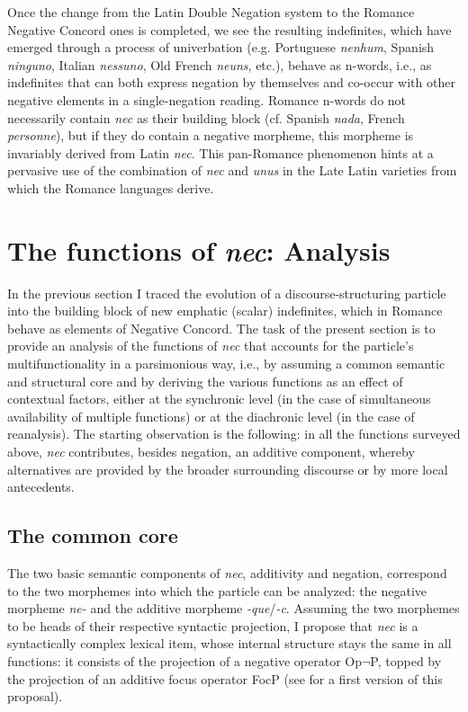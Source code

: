 \documentclass[output=paper]{langsci/langscibook}
\begin{document}
\noindent Once the change from the Latin Double Negation system to the Romance Negative Concord ones is completed, we see the resulting indefinites, which have emerged through a process of univerbation (e.g. Portuguese {\emph{nenhum}}, Spanish {\emph{ninguno}}, Italian {\emph{nessuno}}, Old French {\emph{neuns}}, etc.), behave as n-words, i.e., as indefinites that can both express negation by themselves and co-occur with other negative elements in a single-negation reading. Romance n-words do not necessarily contain {\emph{nec}} as their building block (cf. Spanish {\emph{nada}}, French {\emph{personne}}), but if they do contain a negative morpheme, this morpheme is invariably derived from Latin {\emph{nec}}. This pan-Romance phenomenon hints at a pervasive use of the combination of {\emph{nec}} and {\emph{unus}} in the Late Latin varieties from which the Romance languages derive.

\section{The functions of {\emph{nec}}: Analysis} \label{sectionanalysis}

In the previous section I traced the evolution of a discourse-structuring particle into the building block of new emphatic (scalar) indefinites, which in Romance behave as elements of Negative Concord. The task of the present section is to provide an analysis of the functions of {\emph{nec}} that accounts for the particle's multifunctionality in a parsimonious way, i.e., by assuming a common semantic and structural core and by deriving the various functions as an effect of contextual factors, either at the synchronic level (in the case of simultaneous availability of multiple functions) or at the diachronic level (in the case of reanalysis). The starting observation is the following: in all the functions surveyed above, {\emph{nec}} contributes, besides negation, an additive component, whereby alternatives are provided by the broader surrounding discourse or by more local antecedents.

\subsection{The common core}

The two basic semantic components of {\emph{nec}}, additivity and negation, correspond to the two morphemes into which the particle can be analyzed: the negative morpheme {\emph{ne-}} and the additive morpheme {\emph{-que}}/{\emph{-c}}. Assuming the two morphemes to be heads of their respective syntactic projection, I propose that {\emph{nec}} is a syntactically complex lexical item, whose internal structure stays the same in all functions: it consists of the projection of a negative operator Op$\lnot$P, topped by the projection of an additive focus operator FocP (see \citealt[]{Gianollo17} for a first version of this proposal).
\end{document}
